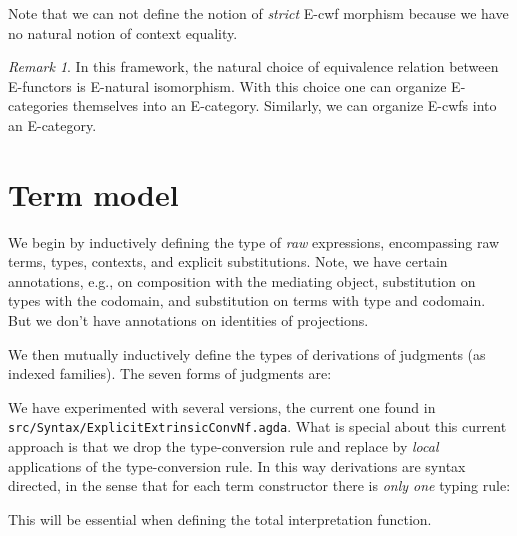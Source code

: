 \documentclass{amsart}
\theoremstyle{plain}
\theoremstyle{definition}
\theoremstyle{remark}
\newtheorem{remark}[theorem]{Remark}
\begin{document}
Note that we can not define the notion of \emph{strict} E-cwf morphism
because we have no natural notion of context equality.

\begin{remark}
  In this framework, the natural choice of equivalence relation
  between E-functors is E-natural isomorphism.  With this choice one
  can organize E-categories themselves into an E-category.  Similarly,
  we can organize E-cwfs into an E-category.
\end{remark}

\section{Term model}
\label{sec:term-model}

We begin by inductively defining the type of \emph{raw} expressions,
encompassing raw terms, types, contexts, and explicit substitutions.
Note, we have certain annotations, e.g., on composition with the
mediating object, substitution on types with the codomain, and
substitution on terms with type and codomain.  But we don't have
annotations on identities of projections.

We then mutually inductively define the types of derivations of
judgments (as indexed families).  The seven forms of judgments are:

We have experimented with several versions, the current one found in
\texttt{src/Syntax/ExplicitExtrinsicConvNf.agda}.  What is special
about this current approach is that we drop the type-conversion rule
and replace by \emph{local} applications of the type-conversion rule.
In this way derivations are syntax directed, in the sense that
for each term constructor there is \emph{only one} typing rule:
This will be essential when defining the total interpretation
function.
\end{document}
